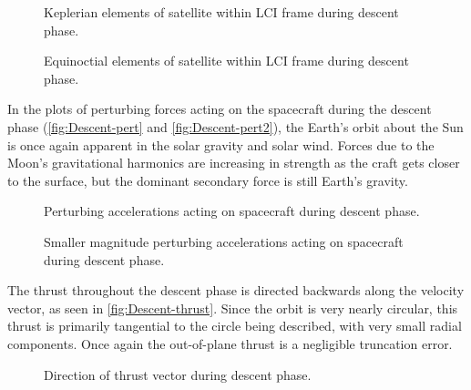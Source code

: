 \begin{figure}
\centering
\def\svgwidth{\figurewidth}

\caption{Keplerian elements of satellite within LCI frame during descent phase.} \label{fig:Descent-kep-lci}
\end{figure}

\begin{figure}
\centering
\def\svgwidth{\figurewidth}

\caption{Equinoctial elements of satellite within LCI frame during descent phase.} \label{fig:Descent-mee}
\end{figure}

In the plots of perturbing forces acting on the spacecraft during the descent phase (\autoref{fig:Descent-pert} and \autoref{fig:Descent-pert2}), the Earth's orbit about the Sun is once again apparent in the solar gravity and solar wind. Forces due to the Moon's gravitational harmonics are increasing in strength as the craft gets closer to the surface, but the dominant secondary force is still Earth's gravity.

\begin{subfigures}
\begin{figure}
\centering
\def\svgwidth{\figurewidth}

\caption{Perturbing accelerations acting on spacecraft during descent phase.} \label{fig:Descent-pert}
\end{figure}

\begin{figure}
\centering
\def\svgwidth{\figurewidth}

\caption{Smaller magnitude perturbing accelerations acting on spacecraft during descent phase.} \label{fig:Descent-pert2}
\end{figure}
\end{subfigures}

The thrust throughout the descent phase is directed backwards along the velocity vector, as seen in \autoref{fig:Descent-thrust}. Since the orbit is very nearly circular, this thrust is primarily tangential to the circle being described, with very small radial components. Once again the out-of-plane thrust is a negligible truncation error.

\begin{figure}
\centering
\def\svgwidth{\figurewidth}

\caption{Direction of thrust vector during descent phase.} \label{fig:Descent-thrust}
\end{figure}

